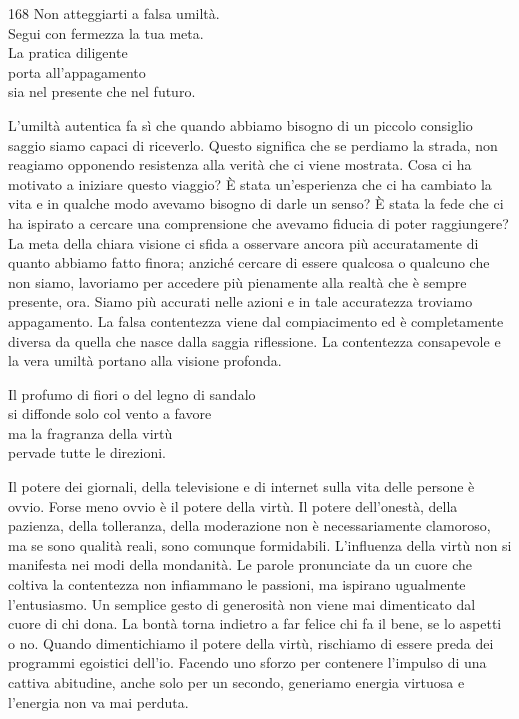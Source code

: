 
\begin{dhpVerse}{168}
\label{dhp-168}
Non atteggiarti a falsa umilt\`{a}.\\
Segui con fermezza la tua meta.\\
La pratica diligente\\
porta all'appagamento\\
sia nel presente che nel futuro.
\end{dhpVerse}

\begin{dhpRefl}
L'umilt\`{a} autentica fa sì che quando abbiamo bisogno di un piccolo consiglio saggio siamo capaci di riceverlo. Questo significa che se perdiamo la strada, non reagiamo opponendo resistenza alla verit\`{a} che ci viene mostrata. Cosa ci ha motivato a iniziare questo viaggio? \`{E} stata un'esperienza che ci ha cambiato la vita e in qualche modo avevamo bisogno di darle un senso? \`{E} stata la fede che ci ha ispirato a cercare una comprensione che avevamo fiducia di poter raggiungere? La meta della chiara visione ci sfida a osservare ancora più accuratamente di quanto abbiamo fatto finora; anzich\'{e} cercare di essere qualcosa o qualcuno che non siamo, lavoriamo per accedere più pienamente alla realt\`{a} che \`{e} sempre presente, ora. Siamo più accurati nelle azioni e in tale accuratezza troviamo appagamento. La falsa contentezza viene dal compiacimento ed \`{e} completamente diversa da quella che nasce dalla saggia riflessione. La contentezza consapevole e la vera umilt\`{a} portano alla visione profonda.
\end{dhpRefl}


\begin{dhpVerse}{54}
\label{dhp-54}
Il profumo di fiori o del legno di sandalo\\
si diffonde solo col vento a favore\\
ma la fragranza della virtù\\
pervade tutte le direzioni.
\end{dhpVerse}

\begin{dhpRefl}
Il potere dei giornali, della televisione e di internet sulla vita delle persone \`{e} ovvio. Forse meno ovvio \`{e} il potere della virtù. Il potere dell'onest\`{a}, della pazienza, della tolleranza, della moderazione non \`{e} necessariamente clamoroso, ma se sono qualit\`{a} reali, sono comunque formidabili. L'influenza della virtù non si manifesta nei modi della mondanit\`{a}. Le parole pronunciate da un cuore che coltiva la contentezza non infiammano le passioni, ma ispirano ugualmente l'entusiasmo. Un semplice gesto di generosit\`{a} non viene mai dimenticato dal cuore di chi dona. La bont\`{a} torna indietro a far felice chi fa il bene, se lo aspetti o no. Quando dimentichiamo il potere della virtù, rischiamo di essere preda dei programmi egoistici dell'io. Facendo uno sforzo per contenere l'impulso di una cattiva abitudine, anche solo per un secondo, generiamo energia virtuosa e l'energia non va mai perduta.
\end{dhpRefl}

